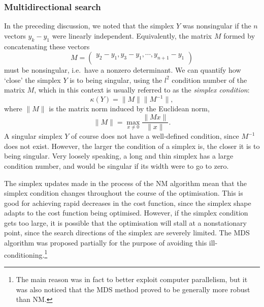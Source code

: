 \subsubsection{Multidirectional search}

In the preceding discussion, we noted that the simplex $Y$ was nonsingular if the $n$ vectors $y_k - y_1$ were linearly independent.
Equivalently, the matrix $M$ formed by concatenating these vectors
\begin{equation}
    \label{eq:simplex_matrix}
    M = \begin{pmatrix}
        y_2 - y_1, y_3 - y_1, \cdots, y_{n+1} - y_1 \\
    \end{pmatrix}
\end{equation}
must be nonsingular, i.e.\ have a nonzero determinant.
We can quantify how `close' the simplex $Y$ is to being singular, using the $l^2$ condition number of the matrix $M$, which in this context is usually referred to as the \textit{simplex condition}:
\begin{equation}
    \label{eq:simplex_condition}
    \kappa(Y) = \lVert M \rVert \lVert M^{-1} \rVert,
\end{equation}
where $\lVert M \rVert$ is the matrix norm induced by the Euclidean norm,
\begin{equation}
    \label{eq:matrix_norm}
    \lVert M \rVert = \max_{x \neq 0} \frac{\lVert Mx \rVert}{\lVert x \rVert}.
\end{equation}
A singular simplex $Y$ of course does not have a well-defined condition, since $M^{-1}$ does not exist.
However, the larger the condition of a simplex is, the closer it is to being singular.
Very loosely speaking, a long and thin simplex has a large condition number, and would be singular if its width were to go to zero.

The simplex updates made in the process of the NM algorithm mean that the simplex condition changes throughout the course of the optimisation.
This is good for achieving rapid decreases in the cost function, since the simplex shape adapts to the cost function being optimised.
However, if the simplex condition gets too large, it is possible that the optimisation will stall at a nonstationary point, since the search directions of the simplex are severely limited.
The MDS algorithm was proposed partially for the purpose of avoiding this ill-conditioning.\footnote{The main reason was in fact to better exploit computer parallelism, but it was also noticed that the MDS method proved to be generally more robust than NM.}

